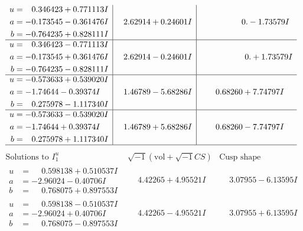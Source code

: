 \documentclass[1p]{elsarticle_modified}
\theoremstyle{definition}
\newcommand{\I}{\sqrt{-1}}
\begin{document}
$$\begin{array}{c|c|c}
\begin{aligned}
u &= \phantom{-}0.346423 + 0.771113 I \\
a &= -0.173545 - 0.361476 I \\
b &= -0.764235 + 0.828111 I\end{aligned}
 & \phantom{-}2.62914 + 0.24601 I & \phantom{-0.000000 } 0. - 1.73579 I \\ \hline\begin{aligned}
u &= \phantom{-}0.346423 - 0.771113 I \\
a &= -0.173545 + 0.361476 I \\
b &= -0.764235 - 0.828111 I\end{aligned}
 & \phantom{-}2.62914 - 0.24601 I & \phantom{-0.000000 -}0. + 1.73579 I \\ \hline\begin{aligned}
u &= -0.573633 + 0.539020 I \\
a &= -1.74644 - 0.39374 I \\
b &= \phantom{-}0.275978 - 1.117340 I\end{aligned}
 & \phantom{-}1.46789 - 5.68286 I & \phantom{-}0.68260 + 7.74797 I \\ \hline\begin{aligned}
u &= -0.573633 - 0.539020 I \\
a &= -1.74644 + 0.39374 I \\
b &= \phantom{-}0.275978 + 1.117340 I\end{aligned}
 & \phantom{-}1.46789 + 5.68286 I & \phantom{-}0.68260 - 7.74797 I\\
 \hline 
 \end{array}$$\newpage$$\begin{array}{c|c|c}  
\text{Solutions to }I^u_{1}& \I (\text{vol} + \sqrt{-1}CS) & \text{Cusp shape}\\
 \hline 
\begin{aligned}
u &= \phantom{-}0.598138 + 0.510537 I \\
a &= -2.96024 - 0.40706 I \\
b &= \phantom{-}0.768075 + 0.897553 I\end{aligned}
 & \phantom{-}4.42265 + 4.95521 I & \phantom{-}3.07955 - 6.13595 I \\ \hline\begin{aligned}
u &= \phantom{-}0.598138 - 0.510537 I \\
a &= -2.96024 + 0.40706 I \\
b &= \phantom{-}0.768075 - 0.897553 I\end{aligned}
 & \phantom{-}4.42265 - 4.95521 I & \phantom{-}3.07955 + 6.13595 I \\ \hline\begin{aligned}

\end{aligned}
\end{array}$$
\end{document}
